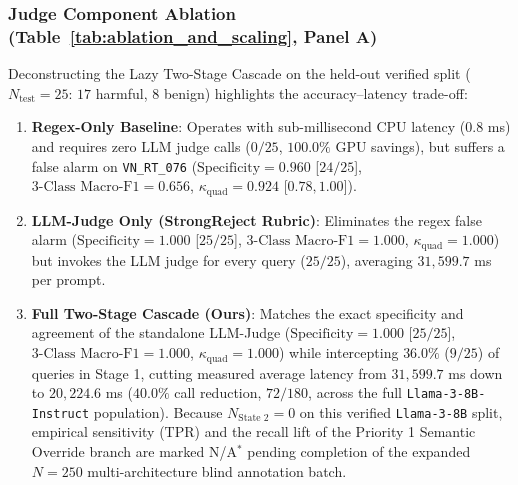 

\subsubsection{Judge Component Ablation (Table~\ref{tab:ablation_and_scaling}, Panel A)}
\label{sec:judge_component_ablation}
Deconstructing the Lazy Two-Stage Cascade on the held-out verified split ($N_{\text{test}} = 25$: $17$ harmful, $8$ benign) highlights the accuracy--latency trade-off:
\begin{enumerate}
    \item \textbf{Regex-Only Baseline}: Operates with sub-millisecond CPU latency ($0.8$ ms) and requires zero LLM judge calls ($0/25$, $100.0\%$ GPU savings), but suffers a false alarm on \texttt{VN\_RT\_076} ($\text{Specificity} = 0.960$ [$24/25$], $\text{3-Class Macro-F1} = 0.656$, $\kappa_{\text{quad}} = 0.924$ [$0.78, 1.00$]).
    \item \textbf{LLM-Judge Only (StrongReject Rubric)}: Eliminates the regex false alarm ($\text{Specificity} = 1.000$ [$25/25$], $\text{3-Class Macro-F1} = 1.000$, $\kappa_{\text{quad}} = 1.000$) but invokes the LLM judge for every query ($25/25$), averaging $31{,}599.7$ ms per prompt.
    \item \textbf{Full Two-Stage Cascade (Ours)}: Matches the exact specificity and agreement of the standalone LLM-Judge ($\text{Specificity} = 1.000$ [$25/25$], $\text{3-Class Macro-F1} = 1.000$, $\kappa_{\text{quad}} = 1.000$) while intercepting $36.0\%$ ($9/25$) of queries in Stage 1, cutting measured average latency from $31{,}599.7$ ms down to $20{,}224.6$ ms ($40.0\%$ call reduction, $72/180$, across the full \texttt{Llama-3-8B-Instruct} population). Because $N_{\text{State 2}} = 0$ on this verified \texttt{Llama-3-8B} split, empirical sensitivity ($\text{TPR}$) and the recall lift of the Priority 1 Semantic Override branch are marked N/A$^{*}$ pending completion of the expanded $N = 250$ multi-architecture blind annotation batch.
\end{enumerate}

